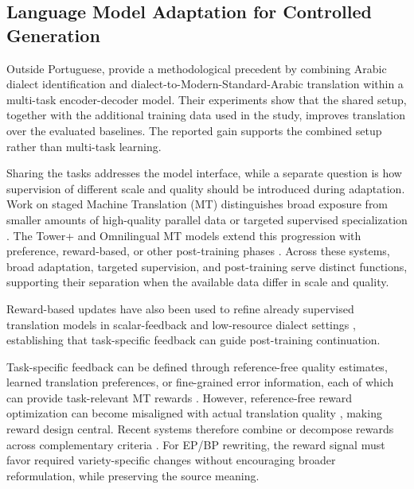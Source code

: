 \documentclass[acmtog,nonacm]{acmart}
\begin{document}
\subsection{Language Model Adaptation for Controlled Generation}
\label{sec:rw-adaptation-controlled-generation}

Outside Portuguese, \citet{khered-etal-2025-multi} provide a methodological
precedent by combining Arabic dialect identification and
dialect-to-Modern-Standard-Arabic translation within a multi-task
encoder-decoder model. Their experiments show that the shared setup, together
with the additional training data used in the study, improves translation over
the evaluated baselines. The reported gain supports the combined setup rather than multi-task learning.

Sharing the tasks addresses the model interface, while a separate question is
how supervision of different scale and quality should be introduced during
adaptation. Work on staged Machine Translation (MT) distinguishes broad
exposure from smaller amounts of high-quality parallel data or targeted
supervised specialization
\citep{xu2024paradigmshiftmachinetranslation,alves2024tower}.
The Tower+ and Omnilingual MT models extend this progression with preference,
reward-based, or other post-training phases
\citep{rei-etal-2026-tower,omnilingualmtteam2026omnilingualmtmachinetranslation}.
Across these systems, broad adaptation, targeted supervision, and post-training
serve distinct functions, supporting their separation when the available data
differ in scale and quality.

Reward-based updates have also been used to refine already supervised
translation models in scalar-feedback and low-resource dialect settings
\citep{nguyen-etal-2017-reinforcement,thu2023rlnmt}, establishing that
task-specific feedback can guide post-training continuation.

Task-specific feedback can be defined through reference-free quality estimates,
learned translation preferences, or fine-grained error information, each of
which can provide task-relevant MT rewards
\citep{he-etal-2024-improving,xu2024advancingtranslationpreferencemodeling,ramos-etal-2026-fine}.
However, reference-free reward optimization can become misaligned with actual
translation quality \citep{he-etal-2024-improving}, making reward design
central. Recent systems therefore combine or decompose rewards across
complementary criteria \citep{feng-etal-2025-mt-r1,10.1162/TACL.a.65}. For EP/BP rewriting, the reward signal must favor required variety-specific changes without encouraging broader reformulation, while preserving the source meaning.
\end{document}
